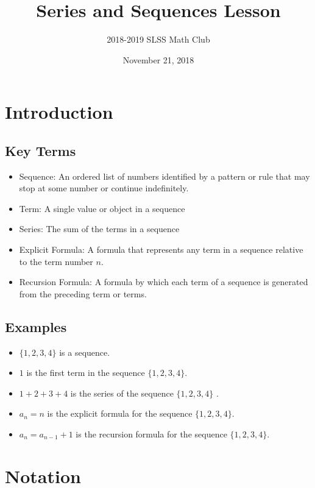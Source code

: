 \documentclass[12pt]{article}
\title{Series and Sequences Lesson\vspace{-3mm}}
\author{2018-2019 SLSS Math Club\vspace{-5mm}}
\date{November 21, 2018\vspace{-5mm}}
\begin{document}
\maketitle

\section{Introduction}
\subsection{Key Terms}
\begin{itemize}
    \item Sequence: An ordered list of numbers identified by a pattern or rule that may stop at some number or continue indefinitely.
    \item Term: A single value or object in a sequence
    \item Series: The sum of the terms in a sequence
    \item Explicit Formula: A formula that represents any term in a sequence relative to the term number $n$.
    \item Recursion Formula: A formula by which each term of a sequence is generated from the preceding term or terms.
\end{itemize}

\subsection{Examples}
\begin{itemize}
    \item $\{1, 2, 3, 4\}$ is a sequence.
    \item $1$ is the first term in the sequence $\{1, 2, 3, 4\}$.
    \item $1 + 2 + 3 + 4$ is the series of the sequence $\{1, 2, 3, 4\}$ .
    \item $a_n = n$ is the explicit formula for the sequence $\{1, 2, 3, 4\}$.
    \item $a_n = a_{n-1} + 1$ is the recursion formula for the sequence $\{1, 2, 3, 4\}$.
\end{itemize}

\section{Notation}
\end{document}
